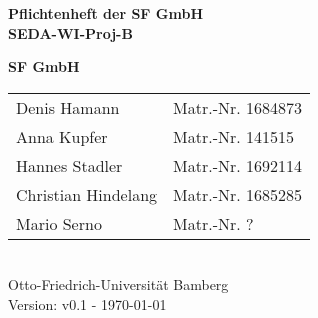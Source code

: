 \documentclass[pdftex, a4paper, 12pt]{article}
\begin{document}


\begin{titlepage}

{\sffamily
\vspace*{2cm}
\begin{center}
	\bfseries
	\LARGE {Pflichtenheft der SF GmbH\\SEDA-WI-Proj-B}
\end{center}
\vspace{1cm}
\begin{center}

	{\Large\bfseries SF GmbH\\[5mm]}

	\begin{tabular}{ll}
		Denis Hamann & Matr.-Nr. 1684873 \\[3mm]

		Anna Kupfer & Matr.-Nr.  141515\\[3mm]

		Hannes Stadler & Matr.-Nr. 1692114 \\[3mm]

		Christian Hindelang & Matr.-Nr. 1685285 \\[3mm]
		
		Mario Serno & Matr.-Nr. ? \\[3mm]


	\end{tabular}\\[0.5cm]
	
{\scriptsize Otto-Friedrich-Universität Bamberg} \\[21pt]


{\footnotesize Version: v0.1 - \today }



\end{center}
}
\end{titlepage}


\newpage

\textcolor{MidnightBlue}{\tableofcontents}

\textcolor{MidnightBlue}{\listoffigures}

\newpage

\newpage

\newpage

\newpage

\newpage

\newpage

\newpage

\newpage

\newpage

\newpage

\newpage

\newpage

\newpage 
%
\end{document}
